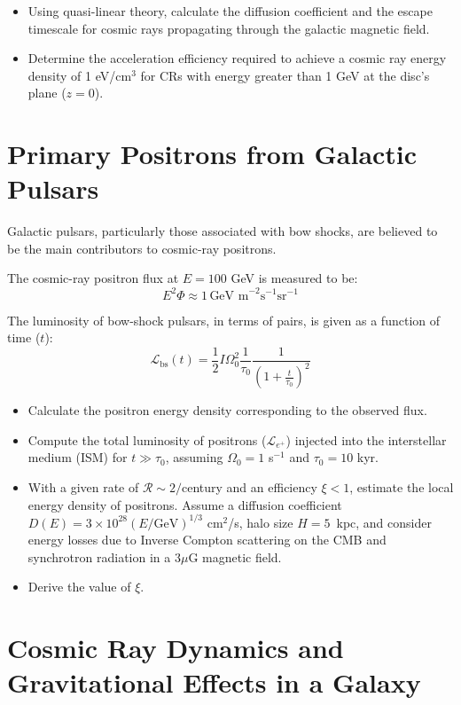 \begin{itemize}
\item Using quasi-linear theory, calculate the diffusion coefficient and the escape timescale for cosmic rays propagating through the galactic magnetic field. 
\item Determine the acceleration efficiency required to achieve a cosmic ray energy density of 1 eV/cm\(^3\) for CRs with energy greater than 1 GeV at the disc's plane (\(z = 0\)).
\end{itemize}

\section{Primary Positrons from Galactic Pulsars}

Galactic pulsars, particularly those associated with bow shocks, are believed to be the main contributors to cosmic-ray positrons. 

The cosmic-ray positron flux at \(E = 100\) GeV is measured to be:
%
\[E^2 \Phi \approx 1 \, \text{GeV m}^{-2} \text{s}^{-1} \text{sr}^{-1}\]

The luminosity of bow-shock pulsars, in terms of pairs, is given as a function of time (\(t\)):
%
\[\mathcal{L}_{\text{bs}}(t) = \frac{1}{2} I \Omega_0^2 \frac{1}{\tau_0} \frac{1}{\left(1+\frac{t}{\tau_0}\right)^2}\]

\begin{itemize}
\item Calculate the positron energy density corresponding to the observed flux. 
\item Compute the total luminosity of positrons (\(\mathcal{L}_{e^+}\)) injected into the interstellar medium (ISM) for \(t \gg \tau_0\), assuming \(\Omega_0 = 1\) s\(^{-1}\) and \(\tau_0 = 10\) kyr. 
\item With a given rate of \(\mathcal{R} \sim 2/\)century and an efficiency \(\xi < 1\), estimate the local energy density of positrons. Assume a diffusion coefficient \(D(E) = 3 \times 10^{28} (E/\text{GeV})^{1/3}\) cm\(^2\)/s, halo size \( H = 5 \)~kpc, and consider energy losses due to Inverse Compton scattering on the CMB and synchrotron radiation in a \(3 \mu\)G magnetic field.
\item Derive the value of \(\xi\).
\end{itemize}

\section{Cosmic Ray Dynamics and Gravitational Effects in a Galaxy}

